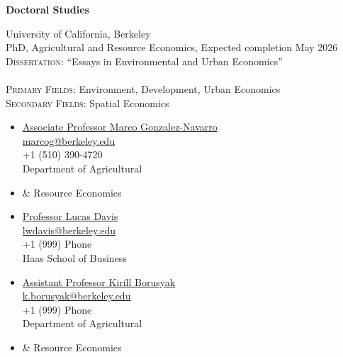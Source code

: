 \documentclass[10pt, oneside]{article}
\begin{document}
\begin{minipage}[t]{0.1\linewidth}
\textbf{Doctoral Studies}
\end{minipage}\hspace{0.05\linewidth}
\begin{minipage}[t]{0.8\linewidth}
University of California, Berkeley\\
PhD, Agricultural and Resource Economics, Expected completion May 2026 \\
\textsc{Dissertation:}  ``Essays in Environmental and Urban Economics'' \\ 
~\\ 
\textsc{Primary Fields:} Environment, Development, Urban Economics \\
\textsc{Secondary Fields:} Spatial Economics \\
\vspace{0.3cm} 

\begin{minipage}[t]{0.5\linewidth}
\begin{itemize}[noitemsep,nolistsep]
\item[] \underline{Associate Professor Marco Gonzalez-Navarro} \\
\href{mailto:marcog@berkeley.edu}{marcog@berkeley.edu} \\ 
+1 (510) 390-4720 \\
Department of Agricultural
\item[] \hspace{4mm} \& Resource Economics \\
\item[] \underline{Professor Lucas Davis} \\
\href{mailto:lwdavis@berkeley.edu}{lwdavis@berkeley.edu} \\
+1 (999) Phone \\
Haas School of Business 
\end{itemize}
\end{minipage}
\begin{minipage}[t]{0.4\linewidth}
\begin{itemize}[noitemsep,nolistsep]
    \item[] \underline{Assistant Professor Kirill Borusyak} \\
\href{k.borusyak@berkeley.edu}{k.borusyak@berkeley.edu} \\ 
+1 (999) Phone \\
Department of Agricultural
\item[] \hspace{4mm} \& Resource Economics
\end{itemize}
\end{minipage}
\end{minipage}\vspace{5mm}
\end{document}
